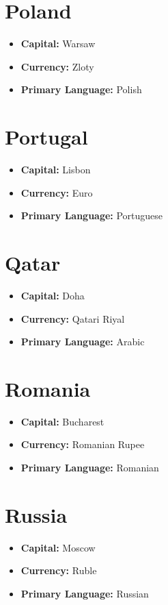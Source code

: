 \documentclass[a4paper,100pt,twoside]{book}
\begin{document}
\section*{\Huge Poland}
\vspace{5mm} %
\begin{itemize}
	\item \textbf{Capital:} Warsaw
	\item \textbf{Currency:} Zloty
	\item \textbf{Primary Language:} Polish
\end{itemize}

\section*{\Huge Portugal}
\vspace{5mm} %
\begin{itemize}
	\item \textbf{Capital:} Lisbon
	\item \textbf{Currency:} Euro
	\item \textbf{Primary Language:} Portuguese
\end{itemize}

\section*{\Huge Qatar}
\vspace{5mm} %
\begin{itemize}
	\item \textbf{Capital:} Doha
	\item \textbf{Currency:} Qatari Riyal
	\item \textbf{Primary Language:} Arabic
\end{itemize}

\section*{\Huge Romania}
\vspace{5mm} %
\begin{itemize}
	\item \textbf{Capital:} Bucharest
	\item \textbf{Currency:} Romanian Rupee
	\item \textbf{Primary Language:} Romanian
\end{itemize}

\section*{\Huge Russia}
\vspace{5mm} %
\begin{itemize}
	\item \textbf{Capital:} Moscow
	\item \textbf{Currency:} Ruble
	\item \textbf{Primary Language:} Russian
\end{itemize}
\end{document}
